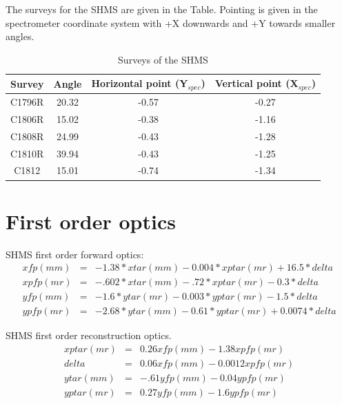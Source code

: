 \documentclass[]{article}
\begin{document}
The surveys for the SHMS are given in the Table.  Pointing is given in the spectrometer 
coordinate system with +X downwards and +Y towards smaller angles.
	\begin{table}[h]
		\begin{center}
			\begin{tabular}[]{|c|c||c|c|} \hline\hline
				Survey & Angle  & Horizontal point (Y$_{spec}$) & Vertical point (X$_{spec}$)\\ \hline
		C1796R & 20.32 & -0.57& -0.27\\ \hline
		C1806R & 15.02 & -0.38 & -1.16 \\ \hline
		C1808R & 24.99  & -0.43 & -1.28 \\ \hline
		C1810R & 39.94  & -0.43 & -1.25 \\ \hline
		C1812  & 15.01  & -0.74 & -1.34 \\ \hline
					\end{tabular}
			\caption{Surveys of the SHMS}
		\end{center}
	\end{table}
	
	\section{First order optics}
	SHMS first order forward optics:
\begin{eqnarray}
xfp (mm) &=& -1.38*xtar (mm) - 0.004*xptar (mr) +16.5*delta \\
xpfp (mr) &=& -.602*xtar (mm) - .72*xptar (mr) - 0.3*delta \\
yfp (mm) &=& -1.6*ytar (mr) - 0.003*yptar (mr) - 1.5*delta \\
ypfp (mr) &=& -2.68*ytar (mm) - 0.61*yptar (mr) +0.0074*delta 
\end{eqnarray}
	
	SHMS first order reconstruction optics.
\begin{eqnarray}
xptar (mr) &=& 0.26 xfp (mm) - 1.38 xpfp (mr) \\
delta   &=& 0.06 xfp  (mm)  - 0.0012 xpfp (mr)\\
ytar  (mm) &=& -.61 yfp (mm) - 0.04ypfp (mr)\\
yptar  (mr)&=& 0.27 yfp (mm) - 1.6 ypfp (mr)
\end{eqnarray}
\end{document}
